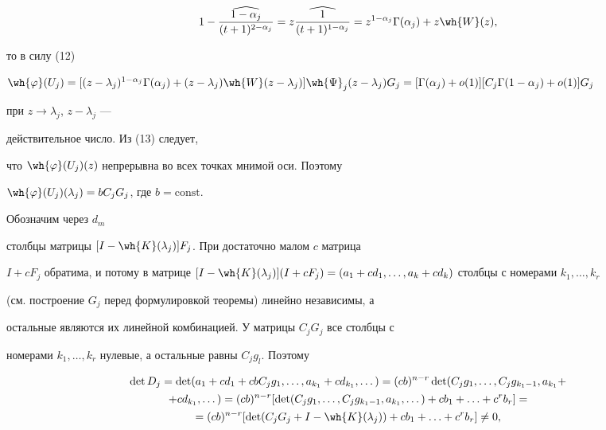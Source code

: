 $$


1-\widehat{\frac{1-\alpha_j}{(t+1)^{2-\alpha_j}}}=


z \widehat{\frac{1}{(t+1)^{1-


\alpha_j}}} = z^{1-\alpha_j} \Gamma (\alpha_j)+z \wh{W}(z),


$$


то в силу (12)


$\wh{\varphi}(U_j)=[(z- \lambda _j)^{1-\alpha_j} \Gamma (\alpha_j)


+(z- \lambda _j) \wh{W}(z- \lambda _j) ] \wh{\Psi}_j


(z- \lambda _j)G_j= [\Gamma (\alpha_j)+o(1)]


[C_j \Gamma (1-\alpha_j)+o(1)] G_j$


при $z \to \lambda_j$, $z - \lambda_j$ ---


действительное число. Из (13) следует,


что $\wh {\varphi}(U_j)(z)$ непрерывна во всех точках мнимой оси. Поэтому


$\wh {\varphi}(U_j)(\lambda_j)= bC_jG_j$, где $b=\text{const}$.


Обозначим через $d_m$


столбцы матрицы $[I-\wh{K}(\lambda_j)]F_j$. При достаточно малом $c$ матрица


$I+cF_j$ обратима, и потому в матрице $[I-\wh{K}(\lambda_j)](I+cF_j)=


(a_1+cd_1, \dotsc, a_k+cd_k)$ столбцы с номерами $k_1, \dotsc, k_r$


(см. построение $G_j$ перед формулировкой теоремы) линейно независимы, а


остальные являются их линейной комбинацией. У матрицы $C_jG_j$ все столбцы с


номерами $k_1, \dotsc, k_r$ нулевые, а остальные равны $C_jg_l$. Поэтому


\begin{multline*}


\det D_j = \det (a_1+cd_1+cbC_jg_1, \dotsc,a_{k_1}+cd_{k_1}, \dotsc )=(cb)


^{n-r} \det (C_jg_1, \dotsc, C_jg_{k_1-1}, a_{k_1}+\\


%


+cd_{k_1}, \dotsc )=


(cb)^{n-r} [ \det (C_jg_1, \dotsc, C_jg_{k_1-1}, a_{k_1}, \dotsc )+


cb_1+ \dotsc +c^rb_r ]= \\


%


=(cb)^{n-r} [ \det (C_jG_j+I-\wh{K}(\lambda_j))+


cb_1+ \dotsc +c^rb_r ] \ne 0,


\end{multline*}


